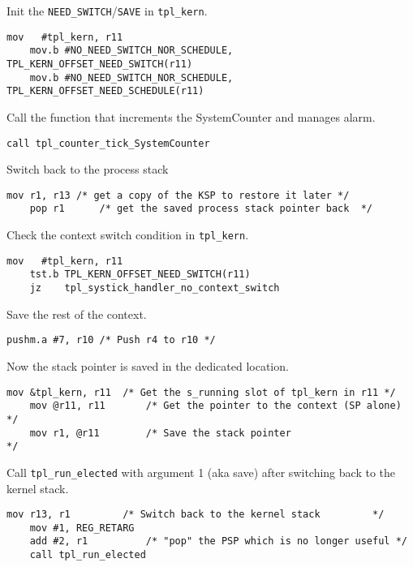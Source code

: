 \documentclass[11pt, oneside]{article}   	%
\begin{document}
Init the \lstinline{NEED_SWITCH}/\lstinline{SAVE} in \lstinline{tpl_kern}.

\begin{lstlisting}[basicstyle=\footnotesize\ttfamily]
    mov   #tpl_kern, r11
    mov.b #NO_NEED_SWITCH_NOR_SCHEDULE, TPL_KERN_OFFSET_NEED_SWITCH(r11)
    mov.b #NO_NEED_SWITCH_NOR_SCHEDULE, TPL_KERN_OFFSET_NEED_SCHEDULE(r11)
\end{lstlisting}

Call the function that increments the SystemCounter and manages alarm.

\begin{lstlisting}[basicstyle=\footnotesize\ttfamily]
    call tpl_counter_tick_SystemCounter
\end{lstlisting}

Switch back to the process stack

\begin{lstlisting}[basicstyle=\footnotesize\ttfamily]
    mov r1, r13 /* get a copy of the KSP to restore it later */
    pop r1      /* get the saved process stack pointer back  */
\end{lstlisting}

Check the context switch condition in \lstinline{tpl_kern}.

\begin{lstlisting}[basicstyle=\footnotesize\ttfamily]
    mov   #tpl_kern, r11
    tst.b TPL_KERN_OFFSET_NEED_SWITCH(r11)
    jz    tpl_systick_handler_no_context_switch
\end{lstlisting}

Save the rest of the context.

\begin{lstlisting}[basicstyle=\footnotesize\ttfamily]
    pushm.a #7, r10 /* Push r4 to r10 */
\end{lstlisting}

Now the stack pointer is saved in the dedicated location.

\begin{lstlisting}[basicstyle=\footnotesize\ttfamily]
    mov &tpl_kern, r11  /* Get the s_running slot of tpl_kern in r11 */
    mov @r11, r11       /* Get the pointer to the context (SP alone) */
    mov r1, @r11        /* Save the stack pointer                    */
\end{lstlisting}

Call \lstinline{tpl_run_elected} with argument 1 (aka save) after switching back to the kernel stack.

\begin{lstlisting}[basicstyle=\footnotesize\ttfamily]
    mov r13, r1         /* Switch back to the kernel stack         */
    mov #1, REG_RETARG
    add #2, r1          /* "pop" the PSP which is no longer useful */
    call tpl_run_elected
\end{lstlisting}
\end{document}
